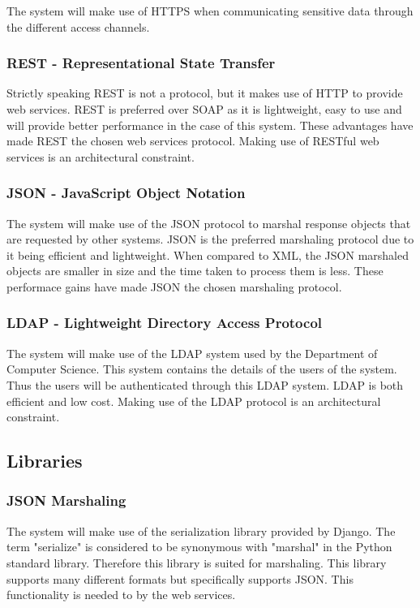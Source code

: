 The system will make use of HTTPS when communicating sensitive data through the different access channels.

\subsubsection{REST - Representational State Transfer}

Strictly speaking REST is not a protocol, but it makes use of HTTP to provide web services. REST is preferred over SOAP as it is lightweight, easy to use and will provide
better performance in the case of this system. These advantages have made REST the chosen web services protocol. Making use of RESTful web services is an architectural constraint.

\subsubsection{JSON - JavaScript Object Notation}

The system will make use of the JSON protocol to marshal response objects that are requested by other systems. JSON is the preferred
marshaling protocol due to it being efficient and lightweight. When compared to XML, the JSON marshaled objects are smaller in size
and the time taken to process them is less. These performace gains have made JSON the chosen marshaling protocol.

\subsubsection{LDAP - Lightweight Directory Access Protocol}

The system will make use of the LDAP system used by the Department of Computer Science. This system contains the details of the users of the system.
Thus the users will be authenticated through this LDAP system. LDAP is both efficient and low cost. Making use of the LDAP protocol is an architectural constraint. 

\subsection{Libraries}

\subsubsection{JSON Marshaling}

The system will make use of the serialization library provided by Django. The term "serialize" is considered to be synonymous with "marshal" in the Python standard library. Therefore this library is suited for marshaling. This library supports many different formats but specifically supports JSON. This functionality is needed to by the web services.

